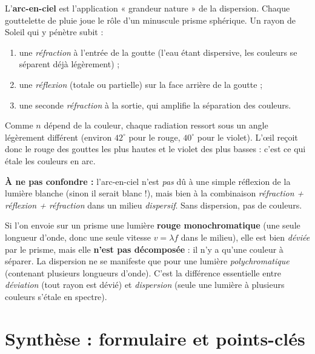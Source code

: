 \documentclass[11pt,a4paper]{article}
\begin{document}
\begin{exemple}
L'\textbf{arc-en-ciel} est l'application « grandeur nature » de la dispersion. Chaque gouttelette de
pluie joue le rôle d'un minuscule prisme sphérique. Un rayon de Soleil qui y pénètre subit :
\begin{enumerate}[leftmargin=1.8em,topsep=2pt]
  \item une \emph{réfraction} à l'entrée de la goutte (l'eau étant dispersive, les couleurs se
        séparent déjà légèrement) ;
  \item une \emph{réflexion} (totale ou partielle) sur la face arrière de la goutte ;
  \item une seconde \emph{réfraction} à la sortie, qui amplifie la séparation des couleurs.
\end{enumerate}
Comme $n$ dépend de la couleur, chaque radiation ressort sous un angle légèrement différent (environ
$42^\circ$ pour le rouge, $40^\circ$ pour le violet). L'œil reçoit donc le rouge des gouttes les plus
hautes et le violet des plus basses : c'est ce qui étale les couleurs en arc.

\smallskip
\textbf{À ne pas confondre :} l'arc-en-ciel n'est \emph{pas} dû à une simple réflexion de la lumière
blanche (sinon il serait blanc !), mais bien à la combinaison \emph{réfraction + réflexion +
réfraction} dans un milieu \emph{dispersif}. Sans dispersion, pas de couleurs.
\end{exemple}

\begin{exemple}
Si l'on envoie sur un prisme une lumière \textbf{rouge monochromatique} (une seule longueur d'onde,
donc une seule vitesse $v = \lambda f$ dans le milieu), elle est bien \emph{déviée} par le prisme,
mais elle \textbf{n'est pas décomposée} : il n'y a qu'une couleur à séparer. La dispersion ne se
manifeste que pour une lumière \emph{polychromatique} (contenant plusieurs longueurs d'onde). C'est
la différence essentielle entre \emph{déviation} (tout rayon est dévié) et \emph{dispersion}
(seule une lumière à plusieurs couleurs s'étale en spectre).
\end{exemple}

\section{Synthèse : formulaire et points-clés}
\end{document}
